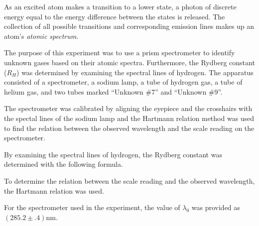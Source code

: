 \begin{paper}

As an excited atom makes a transition to a lower state, a photon of discrete energy equal to the energy difference between the states is released. The collection of all possible transitions and corresponding emission lines makes up an atom's \textit{atomic spectrum}.


The purpose of this experiment was to use a prism spectrometer to identify
unknown gases based on their atomic spectra. %
Furthermore, the Rydberg constant ($R_H$) was determined by examining the
spectral lines of hydrogen.
The apparatus consisted of a spectrometer, a sodium lamp, a tube of hydrogen
gas, a tube of helium gas, and two tubes marked ``Unknown
\#7'' and ``Unknown \#9''.

The spectrometer was calibrated by aligning the eyepiece and the crosshairs with the spectal lines of the sodium lamp and the Hartmann relation method was used to find the
relation between the observed wavelength and the scale reading on the
spectrometer.

By examining the spectral lines of hydrogen, the Rydberg constant was
determined with the following formula.

\begin{paperwhere}
\end{paperwhere}

To determine the relation between the scale reading and the
observed wavelength, the Hartmann relation was used.\columnbreak

\begin{paperwhere}
\end{paperwhere}

For the spectrometer used in the experiment, the value of $\lambda_0$ was
provided as $(285.2\pm.4)\si{\nano\meter}$.


\end{paper}
